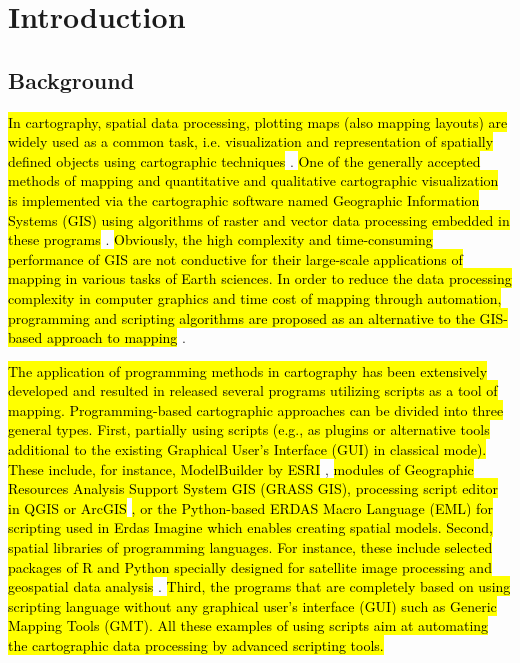 \documentclass[geomatics,article,submit,pdftex,moreauthors]{Definitions/mdpi}
\begin{document}
\section{Introduction}

\subsection{Background}

\hl{In cartography, spatial data processing, plotting maps (also mapping layouts) are widely used as a common task, i.e. visualization and representation of spatially defined objects using cartographic techniques} \cite{PAPPVARY1989103,ROBINSON198991,GOODCHILD20091}. \hl{One of the generally accepted methods of mapping and quantitative and qualitative cartographic visualization is implemented via the cartographic software named Geographic Information Systems (GIS) using algorithms of raster and vector data processing embedded in these programs} \cite{GOODCHILD2009500,SLOCUM1991167,TAYLOR1994333}. \hl{Obviously, the high complexity and time-consuming performance of GIS are not conductive for their large-scale applications of mapping in various tasks of Earth sciences. In order to reduce the data processing complexity in computer graphics and time cost of mapping through automation, programming and scripting algorithms are proposed as an alternative to the GIS-based approach to mapping} \cite{10162166}.

\hl{The application of programming methods in cartography has been extensively developed and resulted in released several programs utilizing scripts as a tool of mapping. Programming-based cartographic approaches can be divided into three general types. First, partially using scripts (e.g., as plugins or alternative tools additional to the existing Graphical User's Interface (GUI) in classical mode). These include, for instance, ModelBuilder by ESRI} \cite{6344536}, \hl{modules of Geographic Resources Analysis Support System GIS (GRASS GIS), processing script editor in QGIS or ArcGIS} \cite{OMRAN2016140,NAGHIBI2021101232}\hl{, or the Python-based ERDAS Macro Language (EML) for scripting used in Erdas Imagine which enables creating spatial models. Second, spatial libraries of programming languages. For instance, these include selected packages of R and Python specially designed for satellite image processing and geospatial data analysis} \cite{ROBERTS2022105192,jimaging8120317,VOS2019104528,app122412554}. \hl{Third, the programs that are completely based on using scripting language without any graphical user's interface (GUI) such as Generic Mapping Tools (GMT). All these examples of using scripts aim at automating the cartographic data processing by advanced scripting tools.}
\end{document}
